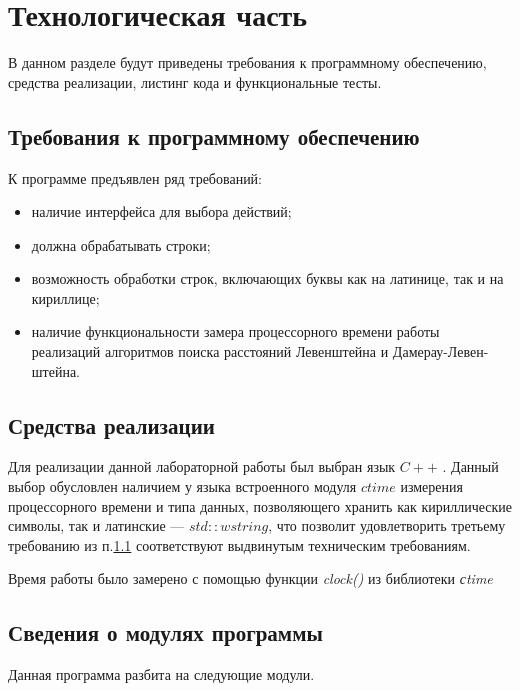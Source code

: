 \chapter{Технологическая часть}

В данном разделе будут приведены требования к программному обеспечению, средства реализации, листинг кода и функциональные тесты.

\section{Требования к программному обеспечению}\label{section:requirements}

К программе предъявлен ряд требований:

\begin{itemize}[label=---]
	\item наличие интерфейса для выбора действий;
	\item должна обрабатывать строки;
	\item возможность обработки строк, включающих буквы как на латинице, так и на кириллице;
	\item наличие функциональности замера процессорного времени работы реализаций алгоритмов поиска расстояний Левенштейна и Дамерау-Левен- штейна.
\end{itemize}

\section{Средства реализации}

Для реализации данной лабораторной работы был выбран язык $C++$ \cite{cpp-lang}. Данный выбор обусловлен наличием у языка встроенного модуля $ctime$ измерения процессорного времени и типа данных, позволяющего хранить как кириллические символы, так и латинские --- $std::wstring$, что позволит удовлетворить третьему требованию из п.\ref{section:requirements} соответствуют выдвинутым техническим требованиям.

Время работы было замерено с помощью функции \textit{clock()} из библиотеки \textit{сtime}~\cite{cpp-lang-time}
 
\clearpage
 
\section{Сведения о модулях программы}

Данная программа разбита на следующие модули.

